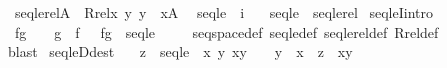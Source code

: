 \begin{isabellebody}
\ \ {\isachardoublequoteopen}seqlerel{\isacharparenleft}{\kern0pt}A{\isacharparenright}{\kern0pt}\ {\isasymequiv}\ Rrel{\isacharparenleft}{\kern0pt}{\isasymlambda}x\ y{\isachardot}{\kern0pt}\ y\ {\isasymsubseteq}\ x{\isacharcomma}{\kern0pt}A{\isacharcircum}{\kern0pt}{\isacharless}{\kern0pt}{\isasymomega}{\isacharparenright}{\kern0pt}{\isachardoublequoteclose}\isanewline
\isanewline
{}\isamarkupfalse%
\isanewline
\ \ seqle\ {\isacharcolon}{\kern0pt}{\isacharcolon}{\kern0pt}\ {\isachardoublequoteopen}i{\isachardoublequoteclose}\ \isanewline
\ \ {\isachardoublequoteopen}seqle\ {\isasymequiv}\ seqlerel{\isacharparenleft}{\kern0pt}{}{\isacharparenright}{\kern0pt}{\isachardoublequoteclose}\isanewline
\isanewline
{}\isamarkupfalse%
\ seqleI{\isacharbrackleft}{\kern0pt}intro{\isacharbang}{\kern0pt}{\isacharbrackright}{\kern0pt}{\isacharcolon}{\kern0pt}\ \isanewline
\ \ {\isachardoublequoteopen}{\isasymlangle}f{\isacharcomma}{\kern0pt}g{\isasymrangle}\ {\isasymin}\ {}{\isacharcircum}{\kern0pt}{\isacharless}{\kern0pt}{\isasymomega}{\isasymtimes}{}{\isacharcircum}{\kern0pt}{\isacharless}{\kern0pt}{\isasymomega}\ {\isasymLongrightarrow}\ g\ {\isasymsubseteq}\ f\ \ {\isasymLongrightarrow}\ {\isasymlangle}f{\isacharcomma}{\kern0pt}g{\isasymrangle}\ {\isasymin}\ seqle{\isachardoublequoteclose}\isanewline
%
\isadelimproof
\ \ %
\endisadelimproof
%
\isatagproof
{}\isamarkupfalse%
\ \ seqspace{\isacharunderscore}{\kern0pt}def\ seqle{\isacharunderscore}{\kern0pt}def\ seqlerel{\isacharunderscore}{\kern0pt}def\ Rrel{\isacharunderscore}{\kern0pt}def\ \isanewline
\ \ \isamarkupfalse%
\ blast%
\endisatagproof
{\isafoldproof}%
%
\isadelimproof
\isanewline
%
\endisadelimproof
\isanewline
{}\isamarkupfalse%
\ seqleD{\isacharbrackleft}{\kern0pt}dest{\isacharbang}{\kern0pt}{\isacharbrackright}{\kern0pt}{\isacharcolon}{\kern0pt}\ \isanewline
\ \ {\isachardoublequoteopen}z\ {\isasymin}\ seqle\ {\isasymLongrightarrow}\ {\isasymexists}x\ y{\isachardot}{\kern0pt}\ {\isasymlangle}x{\isacharcomma}{\kern0pt}y{\isasymrangle}\ {\isasymin}\ {}{\isacharcircum}{\kern0pt}{\isacharless}{\kern0pt}{\isasymomega}{\isasymtimes}{}{\isacharcircum}{\kern0pt}{\isacharless}{\kern0pt}{\isasymomega}\ {\isasymand}\ y\ {\isasymsubseteq}\ x\ {\isasymand}\ z\ {\isacharequal}{\kern0pt}\ {\isasymlangle}x{\isacharcomma}{\kern0pt}y{\isasymrangle}{\isachardoublequoteclose}\isanewline
%
\isadelimproof
\ \ %
\endisadelimproof
%
\isatagproof
{}\isamarkupfalse%

\end{isabellebody}
